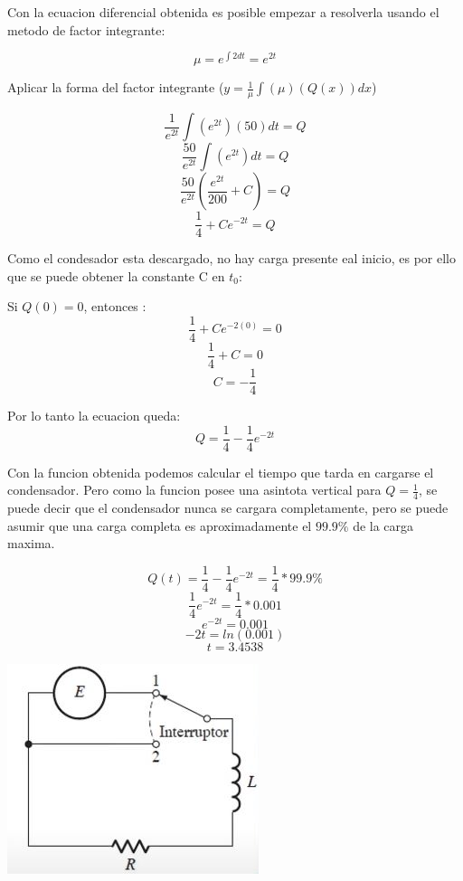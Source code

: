     Con la ecuacion diferencial obtenida es posible empezar a resolverla usando el metodo de factor integrante:

    $$ \mu = e^{\int 2 dt} = e^{2t} $$

    Aplicar la forma del factor integrante ($ y = \frac{1}{\mu} \int{(\mu)(Q(x))}dx  $)

    $$ \frac{1}{e^{2t}} \int{(e^{2t})(50)}dt  = Q$$
    $$ \frac{50}{e^{2t}} \int(e^{2t}) dt = Q$$
    $$ \frac{50}{e^{2t}} (\frac{e^{2t}}{200} + C) = Q$$
    $$ \frac{1}{4} + Ce^{-2t} = Q$$


    Como el condesador esta descargado, no hay carga presente eal inicio, es por ello que se puede obtener la constante C en
    $t_0$:

    Si $Q(0) = 0$, entonces :
    $$ \frac{1}{4} + Ce^{-2(0)} = 0 $$
    $$ \frac{1}{4} + C = 0 $$
    $$ C = -\frac{1}{4} $$


    Por lo tanto la ecuacion queda:
    $$ Q = \frac{1}{4} - \frac{1}{4}e^{-2t} $$

    Con la funcion obtenida podemos calcular el tiempo que tarda en cargarse el condensador. Pero como la funcion 
    posee una asintota vertical para $Q = \frac{1}{4}$, se puede decir que el condensador nunca se cargara completamente, pero
    se puede asumir que una carga completa es aproximadamente el $99.9\%$ de la carga maxima.
    
    $$ Q(t) = \frac{1}{4} - \frac{1}{4}e^{-2t} = \frac{1}{4} * 99.9\% $$
    $$ \frac{1}{4}e^{-2t} = \frac{1}{4} * 0.001 $$
    $$ e^{-2t} = 0.001 $$
    $$ -2t = ln(0.001) $$
    $$ t = 3.4538$$


    \begin{center}
        \includegraphics[scale=1]{chapters/4/images/ej3.jpg}   
    \end{center}

